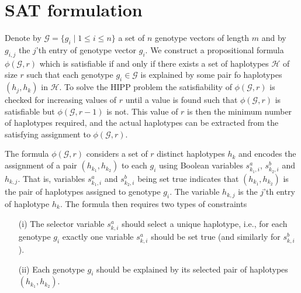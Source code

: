 \documentclass[12pt,a4paper]{article}
\begin{document}
\section{SAT formulation}
\label{sec:hipp-sat}
Denote by $\mathcal{G}=\{g_i\mid 1\leq i \leq n\}$ a set of $n$ genotype vectors of length $m$ and by $g_{i,j}$ the $j$'th entry of genotype vector $g_i$.
We construct a propositional formula $\phi (\mathcal{G}, r)$ which is satisfiable if and only if there exists a set of haplotypes $\mathcal{H}$ of size $r$ such that each genotype $g_i\in \mathcal{G}$ is explained by some pair fo haplotypes $(h_j, h_k)$ in $\mathcal{H}$.
To solve the HIPP problem the satisfiability of $\phi (\mathcal{G}, r)$ is checked for increasing values of $r$ until a value is found such that $\phi (\mathcal{G}, r)$ is satisfiable but $\phi (\mathcal{G}, r-1)$ is not.
This value of $r$ is then the minimum number of haplotypes required, and the actual haplotypes can be extracted from the satisfying assignment to $\phi (\mathcal{G}, r)$.

The formula $\phi (\mathcal{G}, r)$ considers a set of $r$ distinct haplotypes $h_k$ and encodes the assignment of a pair $(h_{k_1}, h_{k_2})$ to each $g_i$ using Boolean variables $s^a_{k_1,i}$, $s^b_{k_2,i}$ and $h_{k,j}$.
That is, variables $s^a_{k_1,i}$ and $s^b_{k_2,i}$ being set true indicates that $(h_{k_1}, h_{k_2})$ is the pair of haplotypes assigned to genotype $g_i$.
The variable $h_{k,j}$ is the $j$'th entry of haplotype $h_k$.
The formula then requires two types of constraints
\begin{enumerate}
\item[(i)] The selector variable $s^a_{k,i}$ should select a unique haplotype, i.e., for each genotype $g_i$ exactly one variable $s^a_{k,i}$ should be set true (and similarly for $s^b_{k,i}$). 
\item[(ii)] Each genotype $g_i$ should be explained by its selected pair of haplotypes $(h_{k_1}, h_{k_2})$. 
\end{enumerate}
\end{document}
